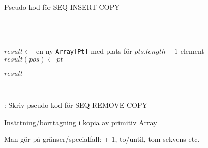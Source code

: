 \begin{Slide}{Pseudo-kod för SEQ-INSERT-COPY}\SlideFontSmall
\begin{algorithm}[H]

 ~\\

~\\


\noindent\hrulefill

$result \leftarrow$ en ny \texttt{Array[Pt]} med plats för $pts.length + 1$ element \\
$result(pos) \leftarrow pt$ \\

$result$

  \noindent\hrulefill\\
\end{algorithm}
\pause\vspace{0.5em}: Skriv pseudo-kod för SEQ-REMOVE-COPY
\end{Slide}

\begin{Slide}{Insättning/borttagning i kopia av primitiv Array}
\vspace{-0.6em}

\pause
\SlideFontSmall Man gör  på gränser/specialfall: +-1, to/until, tom sekvens etc.
\end{Slide}


